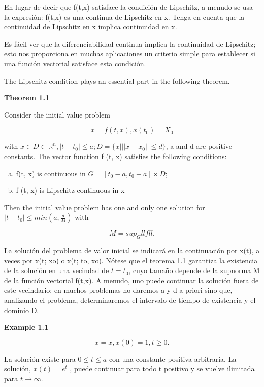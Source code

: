 \documentclass{beamer}
\begin{document}
\begin{frame}
En lugar de decir que f(t,x) satisface la condición de Lipschitz, a menudo se usa la expresión: f(t,x) es una continua de Lipschitz en x. Tenga en cuenta que la continuidad de Lipschitz en x implica continuidad en x.

Es fácil ver que la diferenciabilidad continua implica la continuidad de Lipschitz; esto nos proporciona en muchas aplicaciones un criterio simple para establecer si una función vectorial satisface esta condición.

The Lipschitz condition plays an essential part in the following theorem.

\end{frame}

\begin{frame}
\textbf{Theorem 1.1}

Consider the initial value problem

\[
\dot{x} = f(t, x), x(t_0) = X_0
\]

with $x \in D \subset \mathbb{R}^n, |t-t_0| \leq a; D = \{ x | ||x-x_0|| \leq d \}$, a and d are positive constants. The vector function f (t, x) satisfies the following conditions:

\begin{enumerate}[a.]
\item f(t, x) is continuous in $G = [t_0 - a, t_0 + a] \times D$;
\item  f (t, x) is Lipschitz continuous in x
\end{enumerate}

Then the initial value problem has one and only one solution for $|t - t_0| \leq min(a, \frac{d}{M})$ with

\[
M = sup_G llfll.
\]

\end{frame}

\begin{frame}
La solución del problema de valor inicial se indicará en la continuación por x(t), a veces por x(t; xo) o x(t; to, xo). Nótese que el teorema 1.1 garantiza la existencia de la solución en una vecindad de $t = t_0$, cuyo tamaño depende de la supnorma M de la función vectorial f(t,x). A menudo, uno puede continuar la solución fuera de este vecindario; en muchos problemas no daremos a y d a priori sino que, analizando el problema, determinaremos el intervalo de tiempo de existencia y el dominio D.

\hfill

\textbf{Example 1.1}

\[
\dot{x} = x, x(0) = 1, t \geq 0.
\]

La solución existe para $0 \leq t \leq a$ con una constante positiva arbitraria. La solución, $x(t) = e^t$ , puede continuar para todo t positivo y se vuelve ilimitada para $t \rightarrow \infty $.

\end{frame}
\end{document}
